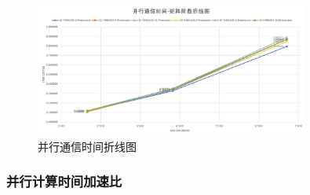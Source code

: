 \documentclass[UTF8]{article}
\begin{document}
    \begin{figure}[h]
        \label{Ratio}
        \centering
            \includegraphics[width=0.8\textwidth]{pdt.png}
            \caption{并行通信时间折线图}
        \end{figure}
\clearpage

\subsubsection{并行计算时间加速比}
\end{document}

